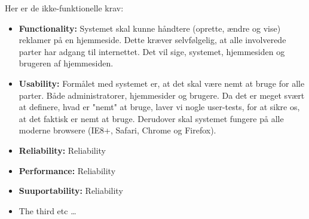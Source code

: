 \documentclass[a4paper,12pt]{article}
\begin{document}
Her er de ikke-funktionelle krav:
\begin{itemize}
	\item \textbf{Functionality:} Systemet skal kunne håndtere (oprette, ændre og vise) reklamer på en hjemmeside. Dette kræver selvfølgelig, at alle involverede parter har adgang til internettet. Det vil sige, systemet, hjemmesiden og brugeren af hjemmesiden.
	\item \textbf{Usability:} Formålet med systemet er, at det skal være nemt at bruge for alle parter. Både administratorer, hjemmesider og brugere. Da det er meget svært at definere, hvad er "nemt" at bruge, laver vi nogle user-tests, for at sikre os, at det faktisk er nemt at bruge. Derudover skal systemet fungere på alle moderne browsere (IE8+, Safari, Chrome og Firefox).
	\item \textbf{Reliability:} Reliability
	\item \textbf{Performance:} Reliability
	\item \textbf{Suuportability:} Reliability 
  
  \item The third etc \ldots
\end{itemize}
\end{document}
